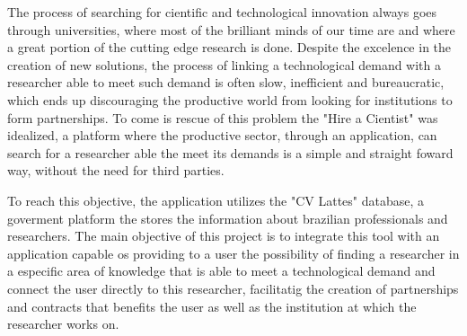 \begin{abstractutfpr}
    The process of searching for cientific and technological innovation always goes through universities, where most of the brilliant minds of our time are and where a great portion of the cutting edge research is done. Despite the excelence in the creation of new solutions, the process of linking a technological demand with a researcher able to meet such demand is often slow, inefficient and bureaucratic, which ends up discouraging the productive world from looking for institutions to form partnerships. To come is rescue of this problem the "Hire a Cientist" was idealized, a platform where the productive sector, through an application, can search for a researcher able the meet its demands is a simple and straight foward way, without the need for third parties.

    To reach this objective, the application utilizes the "CV Lattes" database, a goverment platform the stores the information about brazilian professionals and researchers. The main objective of this project is to integrate this tool with an application capable os providing to a user the possibility of finding a researcher in a especific area of knowledge that is able to meet a technological demand and connect the user directly to this researcher, facilitatig the creation of partnerships and contracts that benefits the user as well as the institution at which the researcher works on.
\end{abstractutfpr}
